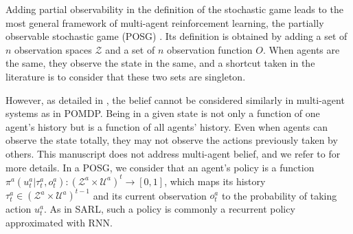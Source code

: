 Adding partial observability in the definition of the stochastic game leads to the most general framework of multi-agent reinforcement learning, the partially observable stochastic game (POSG) \citep{hansen2004dynamic}.
Its definition is obtained by adding a set of $n$ observation spaces $\mathcal{Z}$ and a set of $n$ observation function $O$.
When agents are the same, they observe the state in the same, and a shortcut taken in the literature is to consider that these two sets are singleton.

However, as detailed in \citep{DecPomdp}, the belief cannot be considered similarly in multi-agent systems as in POMDP.
Being in a given state is not only a function of one agent's history but is a function of all agents' history.
Even when agents can observe the state totally, they may not observe the actions previously taken by others.
This manuscript does not address multi-agent belief, and we refer to \citep{DecPomdp} for more details.
In a POSG, we consider that an agent's policy is a function $\pi^{a}(u_t^{a}|\tau_t^{a},o_t^{a}): (\mathcal{Z}^a \times \mathcal{U}^a)^t \rightarrow [0,1]$, which maps its history $\tau_t^{a} \in (\mathcal{Z}^a \times \mathcal{U}^a)^{t-1}$ and its current observation $o_t^{a}$ to the probability of taking action $u_t^{a}$.
As in SARL, such a policy is commonly a recurrent policy approximated with RNN.


